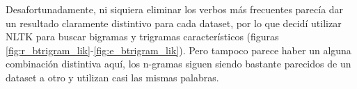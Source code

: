 \documentclass{pre-tfg}
\begin{document}
\begin{comment}
\begin{figure}[h!]
	\centering
	\begin{subfigure}{\textwidth}
		\texttt{[image: f\_verbs\_0]}
		\caption{Verbos más frecuentes en el dataset de amistad.}
		\label{fig:f_verb_freq_in_dataset}
		
	\end{subfigure}
	\begin{subfigure}{\textwidth}
		\texttt{[image: f\_verbs\_1]}
		\caption{Verbos más frecuentes en el dataset de amistad, tras retirar los más comunes.}
		\label{fig:f_verb_freq_removed}
	\end{subfigure}
	
	
\end{figure}


\begin{figure}[!h]
	\centering
	\begin{subfigure}{\textwidth}
		\texttt{[image: e\_verbs\_0]}
		\caption{Verbos más frecuentes en el dataset de enemistad.}
		\label{fig:e_verb_freq_in_dataset}
		
	\end{subfigure}
	\begin{subfigure}{\textwidth}
		\texttt{[image: e\_verbs\_1]}
		\caption{Verbos más frecuentes en el dataset de enemistad, tras retirar los más comunes.}
		\label{fig:e_verb_freq_removed}
	\end{subfigure}
	
	
\end{figure}

\end{comment}

Desafortunadamente, ni siquiera eliminar los verbos más frecuentes parecía dar un resultado claramente distintivo para cada dataset, por lo que decidí utilizar NLTK para buscar bigramas y trigramas característicos (figuras \ref{fig:r_btrigram_lik}-\ref{fig:e_btrigram_lik}). Pero tampoco parece haber un alguna combinación distintiva aquí, los n-gramas siguen siendo bastante parecidos de un dataset a otro y utilizan casi las mismas palabras.
\end{document}

